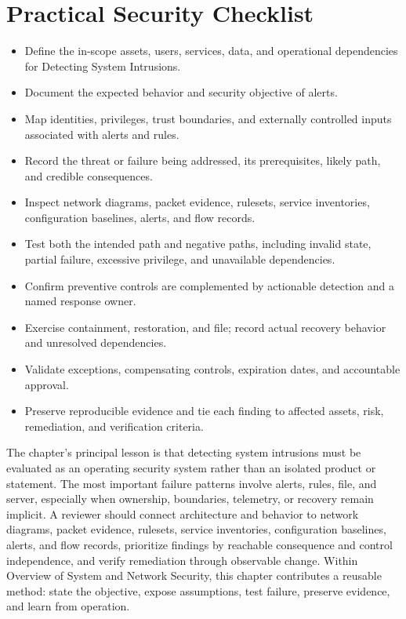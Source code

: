 \documentclass[11pt]{article}
\begin{document}
\section*{Practical Security Checklist}
\begin{itemize}[label=$\square$]
\item Define the in-scope assets, users, services, data, and operational dependencies for Detecting System Intrusions.
\item Document the expected behavior and security objective of alerts.
\item Map identities, privileges, trust boundaries, and externally controlled inputs associated with alerts and rules.
\item Record the threat or failure being addressed, its prerequisites, likely path, and credible consequences.
\item Inspect network diagrams, packet evidence, rulesets, service inventories, configuration baselines, alerts, and flow records.
\item Test both the intended path and negative paths, including invalid state, partial failure, excessive privilege, and unavailable dependencies.
\item Confirm preventive controls are complemented by actionable detection and a named response owner.
\item Exercise containment, restoration, and file; record actual recovery behavior and unresolved dependencies.
\item Validate exceptions, compensating controls, expiration dates, and accountable approval.
\item Preserve reproducible evidence and tie each finding to affected assets, risk, remediation, and verification criteria.
\end{itemize}
\begin{synthesisbox}
The chapter's principal lesson is that detecting system intrusions must be evaluated as an operating security system rather than an isolated product or statement. The most important failure patterns involve alerts, rules, file, and server, especially when ownership, boundaries, telemetry, or recovery remain implicit. A reviewer should connect architecture and behavior to network diagrams, packet evidence, rulesets, service inventories, configuration baselines, alerts, and flow records, prioritize findings by reachable consequence and control independence, and verify remediation through observable change. Within Overview of System and Network Security, this chapter contributes a reusable method: state the objective, expose assumptions, test failure, preserve evidence, and learn from operation.
\end{synthesisbox}
\end{document}
